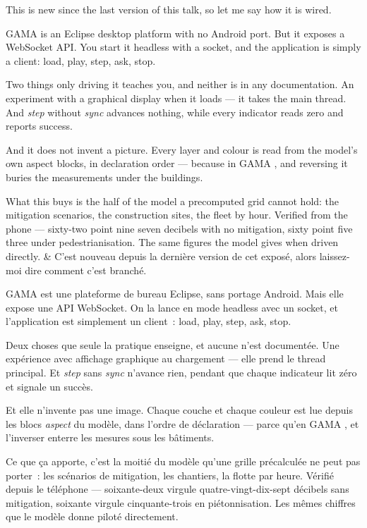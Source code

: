 \documentclass[10pt,a4paper]{article}
\begin{document}
\begin{say}
This is new since the last version of this talk, so let me say how it is wired.

GAMA is an Eclipse desktop platform with no Android port. But it exposes a
WebSocket API. You start it headless with a socket, and the application is simply
a client: load, play, step, ask, stop. 

Two things only driving it teaches you, and neither is in any documentation. An
experiment with a graphical display  when it loads --- it
takes the main thread. And \emph{step} without \emph{sync} advances nothing, while
every indicator reads zero and reports success.

And it does not invent a picture. Every layer and colour is read from the model's
own aspect blocks, in declaration order --- because in GAMA , and reversing it buries the measurements under the buildings.

What this buys is the half of the model a precomputed grid cannot hold: the
mitigation scenarios, the construction sites, the fleet by hour. Verified from the
phone --- sixty-two point nine seven decibels with no mitigation, sixty point five
three under pedestrianisation. The same figures the model gives when driven
directly.
&
C'est nouveau depuis la dernière version de cet exposé, alors laissez-moi dire
comment c'est branché.

GAMA est une plateforme de bureau Eclipse, sans portage Android. Mais elle expose
une API WebSocket. On la lance en mode headless avec un socket, et l'application
est simplement un client~: load, play, step, ask, stop. 

Deux choses que seule la pratique enseigne, et aucune n'est documentée. Une
expérience avec affichage graphique  au chargement --- elle
prend le thread principal. Et \emph{step} sans \emph{sync} n'avance rien, pendant
que chaque indicateur lit zéro et signale un succès.

Et elle n'invente pas une image. Chaque couche et chaque couleur est lue depuis les
blocs \emph{aspect} du modèle, dans l'ordre de déclaration --- parce qu'en GAMA
, et l'inverser enterre les mesures
sous les bâtiments.

Ce que ça apporte, c'est la moitié du modèle qu'une grille précalculée ne peut pas
porter~: les scénarios de mitigation, les chantiers, la flotte par heure. Vérifié
depuis le téléphone --- soixante-deux virgule quatre-vingt-dix-sept décibels sans
mitigation, soixante virgule cinquante-trois en piétonnisation. Les mêmes chiffres
que le modèle donne piloté directement.
\end{say}
\end{document}
